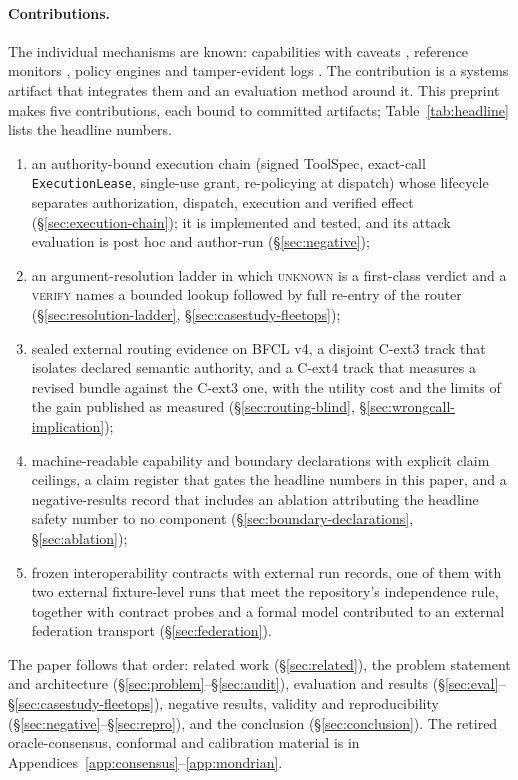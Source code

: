 \documentclass[10pt,twocolumn]{article}
\begin{document}
\paragraph{Contributions.} The individual mechanisms are known:
capabilities with caveats \cite{birgisson2014macaroons}, reference
monitors \cite{anderson1972planning}, policy engines and tamper-evident
logs \cite{crosby2009tamper}. The contribution is a systems artifact that integrates
them and an evaluation method around it. This preprint makes five
contributions, each
bound to committed artifacts; Table~\ref{tab:headline} lists the headline
numbers.
\begin{enumerate}[leftmargin=*,itemsep=1pt]
\item an authority-bound execution chain (signed ToolSpec, exact-call
  \texttt{ExecutionLease}, single-use grant, re-policying at dispatch) whose
  lifecycle separates authorization, dispatch, execution and verified effect
  (\S\ref{sec:execution-chain}); it is implemented and tested, and its
  attack evaluation is post hoc and author-run (\S\ref{sec:negative});
\item an argument-resolution ladder in which \textsc{unknown} is a
  first-class verdict and a \textsc{verify} names a bounded lookup followed
  by full re-entry of the router (\S\ref{sec:resolution-ladder},
  \S\ref{sec:casestudy-fleetops});
\item sealed external routing evidence on BFCL v4, a disjoint C-ext3
  track that isolates declared semantic authority, and a C-ext4 track that
  measures a revised bundle against the C-ext3 one, with the utility cost
  and the limits of the gain published as measured (\S\ref{sec:routing-blind},
  \S\ref{sec:wrongcall-implication});
\item machine-readable capability and boundary declarations with explicit
  claim ceilings, a claim register that gates the headline numbers in this paper,
  and a negative-results record that includes an ablation attributing the
  headline safety number to no component
  (\S\ref{sec:boundary-declarations}, \S\ref{sec:ablation});
\item frozen interoperability contracts with external run records, one of
  them with two external fixture-level runs that meet the repository's
  independence rule, together with contract probes and a
  formal model contributed to an external federation transport
  (\S\ref{sec:federation}).
\end{enumerate}
The paper follows that order: related work (\S\ref{sec:related}), the
problem statement and architecture
(\S\ref{sec:problem}--\S\ref{sec:audit}), evaluation and results
(\S\ref{sec:eval}--\S\ref{sec:casestudy-fleetops}), negative results,
validity and reproducibility (\S\ref{sec:negative}--\S\ref{sec:repro}), and
the conclusion (\S\ref{sec:conclusion}). The retired oracle-consensus,
conformal and calibration material is in
Appendices~\ref{app:consensus}--\ref{app:mondrian}.
\end{document}
